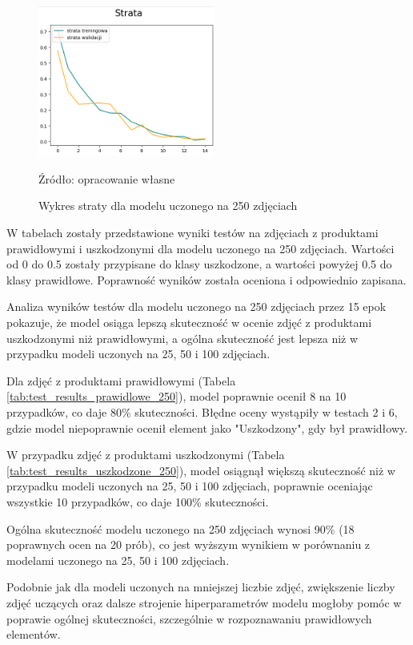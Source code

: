 \begin{figure}[htbp]
  \centering
  \caption{Wykres straty dla modelu uczonego na 250 zdjęciach}
  \includegraphics[width=220px]{images/strata_250.png}
  \begin{center}
  \footnotesize{Źródło: opracowanie własne}
  \end{center}
  \label{fig:wykres_strata_250}
\end{figure}

\newpage

W tabelach zostały przedstawione wyniki testów na zdjęciach z produktami prawidłowymi i uszkodzonymi dla modelu uczonego na 250 zdjęciach. Wartości od 0 do 0.5 zostały przypisane do klasy uszkodzone, a wartości powyżej 0.5 do klasy prawidłowe. Poprawność wyników została oceniona i odpowiednio zapisana.

Analiza wyników testów dla modelu uczonego na 250 zdjęciach przez 15 epok pokazuje, że model osiąga lepszą skuteczność w ocenie zdjęć z produktami uszkodzonymi niż prawidłowymi, a ogólna skuteczność jest lepsza niż w przypadku modeli uczonych na 25, 50 i 100 zdjęciach.

Dla zdjęć z produktami prawidłowymi (Tabela \ref{tab:test_results_prawidlowe_250}), model poprawnie ocenił 8 na 10 przypadków, co daje 80\% skuteczności. Błędne oceny wystąpiły w testach 2 i 6, gdzie model niepoprawnie ocenił element jako "Uszkodzony", gdy był prawidłowy.

W przypadku zdjęć z produktami uszkodzonymi (Tabela \ref{tab:test_results_uszkodzone_250}), model osiągnął większą skuteczność niż w przypadku modeli uczonych na 25, 50 i 100 zdjęciach, poprawnie oceniając wszystkie 10 przypadków, co daje 100\% skuteczności.

Ogólna skuteczność modelu uczonego na 250 zdjęciach wynosi 90\% (18 poprawnych ocen na 20 prób), co jest wyższym wynikiem w porównaniu z modelami uczonego na 25, 50 i 100 zdjęciach.

Podobnie jak dla modeli uczonych na mniejszej liczbie zdjęć, zwiększenie liczby zdjęć uczących oraz dalsze strojenie hiperparametrów modelu mogłoby pomóc w poprawie ogólnej skuteczności, szczególnie w rozpoznawaniu prawidłowych elementów.

